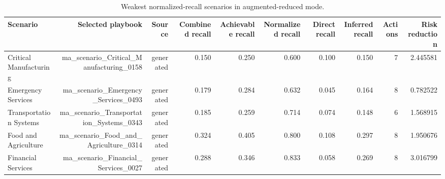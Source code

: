 \begin{table}[tb]
\centering
\caption{Weakest normalized-recall scenarios in augmented-reduced mode.}
\label{tab:weakest\_normalized\_recall}
\begin{tabular}{lrrrrrrrrr}
\toprule
Scenario & Selected playbook & Source & Combined recall & Achievable recall & Normalized recall & Direct recall & Inferred recall & Actions & Risk reduction \\
\midrule
Critical Manufacturing & ma\_scenario\_Critical\_Manufacturing\_0158 & generated & 0.150 & 0.250 & 0.600 & 0.100 & 0.150 & 7 & 2.445581 \\
Emergency Services & ma\_scenario\_Emergency\_Services\_0493 & generated & 0.179 & 0.284 & 0.632 & 0.045 & 0.164 & 8 & 0.782522 \\
Transportation Systems & ma\_scenario\_Transportation\_Systems\_0343 & generated & 0.185 & 0.259 & 0.714 & 0.074 & 0.148 & 6 & 1.568915 \\
Food and Agriculture & ma\_scenario\_Food\_and\_Agriculture\_0314 & generated & 0.324 & 0.405 & 0.800 & 0.108 & 0.297 & 8 & 1.950676 \\
Financial Services & ma\_scenario\_Financial\_Services\_0027 & generated & 0.288 & 0.346 & 0.833 & 0.058 & 0.269 & 8 & 3.016799 \\
\bottomrule
\end{tabular}
\end{table}
